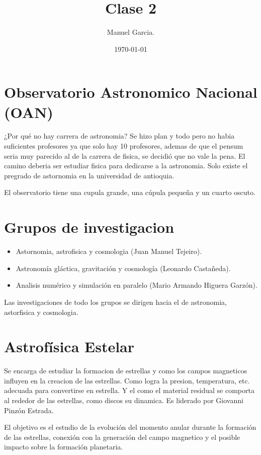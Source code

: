 \documentclass{article}
\title{Clase 2 }
\author{Manuel Garcia.}
\date{\today}
\begin{document}
\maketitle

\section{Observatorio Astronomico Nacional (OAN)}
¿Por qué no hay carrera de astronomia? Se hizo plan y todo pero no habia suficientes profesores ya que solo hay 10 profesores, ademas de que el pensum seria muy parecido al de la carrera de fisica, se decidió que no vale la pena. El camino deberia ser estudiar fisica para dedicarse a la astronomia. Solo existe el pregrado de astornomia en la universidad de antioquia.

El observatorio tiene una cupula grande, una cúpula pequeña y un cuarto oscuto.

\section{Grupos de investigacion}
\begin{itemize}
  \item Astornomia, astrofisica y cosmologia (Juan Manuel Tejeiro). 
  \item Astronomía gláctica, gravitación y cosmología (Leonardo Castañeda). 
  \item Analisis numérico y simulación en paralelo (Mario Armando Higuera Garzón). 
\end{itemize}
Las investigaciones de todo los grupos se dirigen hacia el de astronomia, astorfisica y cosmologia.

\section{Astrofísica Estelar }
Se encarga de estudiar la formacion de estrellas y como los campos magneticos influyen en la creacion de las estrellas. Como logra la presion, temperatura, etc. adecuada para convertirse en estrella. Y el como el material residual se comporta al rededor de las estrellas, como discos su dinamica. Es liderado por Giovanni Pinzón Estrada.

El objetivo es el estudio de la evolución del momento anular durante la formación de las estrellas, conexión con la generación del campo magnetico y el posible impacto sobre la formación planetaria. 

\hfill
\end{document}
